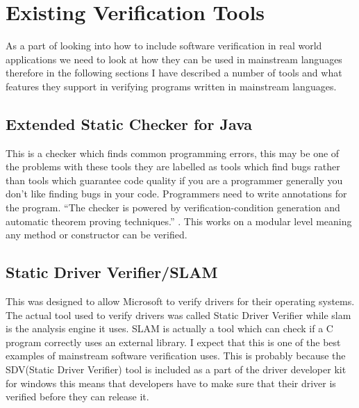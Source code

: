 \documentclass[a4paper,12pt]{scrartcl}
\begin{document}
	\section{Existing Verification Tools}
	{
		As a part of looking into how to include software verification in real world applications we need to look at how they can be used in mainstream languages therefore in the following sections I have described a number of tools and what features they support in verifying programs written in mainstream languages.
		\subsection{Extended Static Checker for Java\cite{Flanagan2002}}
		{
			This is a checker which finds common programming errors, this may be one of the problems with these tools they are labelled as tools which find bugs rather than tools which guarantee code quality if you are a programmer generally you don't like finding bugs in your code. Programmers need to write annotations for the program. \enquote{The checker is powered by verification-condition generation and automatic theorem proving techniques.}\cite{Flanagan2002} . This works  on a modular level meaning any method or constructor can be verified.
		}
		\subsection{Static Driver Verifier/SLAM\cite{Ball2004}}
		{
			This was designed to allow Microsoft to verify drivers for their operating systems. The actual tool used to verify drivers was called Static Driver Verifier while slam is the analysis engine it uses. SLAM is actually a tool which can check if a C program correctly uses an external library. I expect that this is one of the best examples of mainstream software verification uses. This is probably because the SDV(Static Driver Verifier) tool is included as a part of the driver developer kit for windows this means that developers have to make sure that their driver is verified before they can release it.
		}
}
\end{document}
